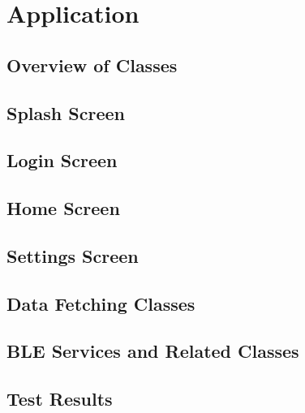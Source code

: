 \documentclass[../report.tex]{subfiles}
\begin{document}
\section{Application}
\subsection{Overview of Classes}

\subsection{Splash Screen}

\subsection{Login Screen}

\subsection{Home Screen}

\subsection{Settings Screen}

\subsection{Data Fetching Classes}

\subsection{BLE Services and Related Classes}

\subsection{Test Results}
\end{document}
